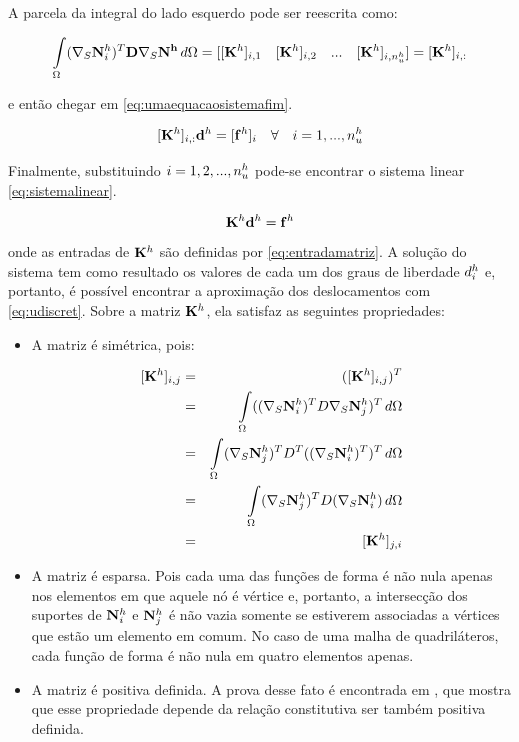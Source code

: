 A parcela da integral do lado esquerdo pode ser reescrita como:

\begin{equation}
\omeint{(\sopnabla \basefunctionfine)^T \mathbf{D} \sopnabla \mathbf{N^h} }= [ [\rigidmatrix]_{i,1}\quad   [\rigidmatrix]_{i,2} \quad ... \quad  [\rigidmatrix]_{i,\qtdfreedomfine}] =  [\rigidmatrix]_{i,:}
\end{equation}

e então chegar em \eqref{eq:umaequacaosistemafim}.

\begin{equation} \label{eq:umaequacaosistemafim}
[\rigidmatrix]_{i,:} \mathbf{d}^h = [\mathbf{f}^h]_i \quad \forall \quad i=1,..., \qtdfreedomfine
\end{equation}

Finalmente, substituindo  $i = 1, 2, ..., \qtdfreedomfine$ pode-se encontrar o sistema linear \eqref{eq:sistemalinear}.

\begin{equation}\label{eq:sistemalinear}
    \rigidmatrix \mathbf{d}^h = \mathbf{f}^h
\end{equation}
onde as entradas de $\rigidmatrix $ são definidas por \eqref{eq:entradamatriz}. A solução do sistema tem como resultado os valores de cada um dos graus de liberdade $\freedomfine$ e, portanto, é possível encontrar a aproximação dos deslocamentos com \eqref{eq:udiscret}. Sobre a matriz $\rigidmatrix$, ela satisfaz as seguintes propriedades:


\begin{itemize}
    \item A matriz é simétrica, pois:

    \begin{eqnarray}
    \rigidmatrixentry & = & (\rigidmatrixentry)^T \\
            & = & \omeint{((\sopnabla \basefunctionfine)^T D \sopnabla \basefunctionfine[j])^T} \\
            & = & \omeint{ ( \sopnabla \basefunctionfine[j])^T D^T  ((\sopnabla \basefunctionfine)^T)^T}\\
            & = & \omeint{ ( \sopnabla \basefunctionfine[j])^T D  (\sopnabla \basefunctionfine)} \\
            & = & [\rigidmatrix]_{j,i}
    \end{eqnarray}


    \item A matriz é esparsa. Pois cada uma das funções de forma é não nula apenas nos elementos em que aquele nó é vértice e, portanto, a intersecção dos suportes de $\basefunctionfine$ e $\basefunctionfine[j]$ é não vazia somente se estiverem associadas a vértices que estão um elemento em comum. No caso de uma malha de quadriláteros, cada função de forma é não nula em quatro elementos apenas.

    \item A matriz é positiva definida. A prova desse fato é encontrada em \cite{hughes}, que mostra que esse propriedade depende da relação constitutiva ser também positiva definida.
\end{itemize}


